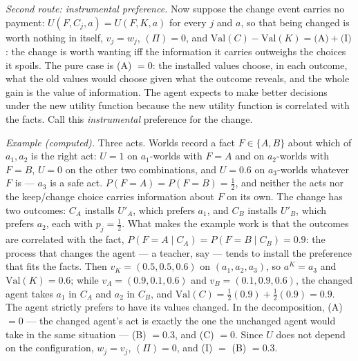 \documentclass[11pt,a4paper]{article}
\begin{document}
\emph{Second route: instrumental preference.} Now suppose the change event carries no payment: $U(F, C_j, a) = U(F, K, a)$ for every $j$ and $a$, so that being changed is worth nothing in itself, $v_j = w_j$, $(\Pi) = 0$, and $\mathrm{Val}(C) - \mathrm{Val}(K) = \text{(A)} + \text{(I)}$: the change is worth wanting iff the information it carries outweighs the choices it spoils. The pure case is (A) $= 0$: the installed values choose, in each outcome, what the old values would choose given what the outcome reveals, and the whole gain is the value of information. The agent expects to make better decisions under the new utility function because the new utility function is correlated with the facts. Call this \emph{instrumental} preference for the change.

\emph{Example (computed).} Three acts. Worlds record a fact $F \in \{A, B\}$ about which of $a_1, a_2$ is the right act: $U = 1$ on $a_1$-worlds with $F = A$ and on $a_2$-worlds with $F = B$, $U = 0$ on the other two combinations, and $U = 0.6$ on $a_3$-worlds whatever $F$ is --- $a_3$ is a safe act. $P(F = A) = P(F = B) = \tfrac12$, and neither the acts nor the keep/change choice carries information about $F$ on its own. The change has two outcomes: $C_A$ installs $U'_A$, which prefers $a_1$, and $C_B$ installs $U'_B$, which prefers $a_2$, each with $p_j = \tfrac12$. What makes the example work is that the outcomes are correlated with the fact, $P(F = A \mid C_A) = P(F = B \mid C_B) = 0.9$: the process that changes the agent --- a teacher, say --- tends to install the preference that fits the facts. Then $v_K = (0.5, 0.5, 0.6)$ on $(a_1, a_2, a_3)$, so $a^K = a_3$ and $\mathrm{Val}(K) = 0.6$; while $v_A = (0.9, 0.1, 0.6)$ and $v_B = (0.1, 0.9, 0.6)$, the changed agent takes $a_1$ in $C_A$ and $a_2$ in $C_B$, and $\mathrm{Val}(C) = \tfrac12 (0.9) + \tfrac12 (0.9) = 0.9$. The agent strictly prefers to have its values changed. In the decomposition, (A) $= 0$ --- the changed agent's act is exactly the one the unchanged agent would take in the same situation --- (B) $= 0.3$, and (C) $= 0$. Since $U$ does not depend on the configuration, $w_j = v_j$, $(\Pi) = 0$, and (I) $=$ (B) $= 0.3$.
\end{document}
